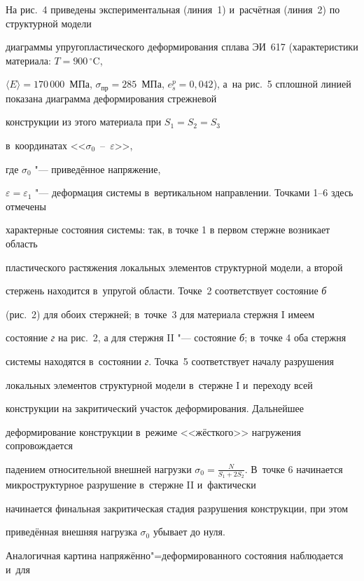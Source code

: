 На рис.~4 приведены экспериментальная (линия~1) и~расчётная (линия~2) по структурной модели

диаграммы упругопластического деформирования сплава ЭИ~617 (характеристики материала: $T =900\,^\circ$C, 

$\langle E\rangle=170\,000$~МПа, $\sigma_{\text{пр}}=285$~МПа, $e_s^p=0,042$), а~на рис.~5 сплошной линией показана диаграмма деформирования стрежневой

конструкции из этого материала при $S_1=S_2=S_3$

в~координатах <<$\sigma_0$~--~$\varepsilon$>>, 

где $\sigma_0$ "--- приведённое напряжение,

$ \varepsilon=\varepsilon_1$ "--- деформация системы в~вертикальном направлении. Точками 1--6 здесь отмечены

характерные состояния системы: так, в точке 1  в первом стержне возникает область

пластического растяжения локальных элементов структурной модели, а второй

стержень находится в~упругой области. Точке~2 соответствует состояние \textsl{б}

(рис.~2) для обоих стержней; в~точке~3 для материала стержня I имеем

состояние \textsl{г} на рис.~2, а для стержня II "--- состояние \textsl{б}; в~точке 4 оба стержня 

системы находятся в~состоянии \textsl{г}. Точка~5 соответствует началу разрушения

локальных элементов структурной модели в~стержне I и~переходу всей

конструкции на закритический участок деформирования. Дальнейшее

деформирование конструкции в~режиме <<жёсткого>> нагружения сопровождается

падением относительной внешней нагрузки $\sigma_0=\frac{N}{S_1+2S_2}$. В~точке 6 начинается микроструктурное разрушение в~стержне II и~фактически

начинается финальная закритическая стадия разрушения конструкции, при этом

приведённая внешняя нагрузка $\sigma _0 $ убывает до нуля.









Аналогичная картина напряжённо"=деформированного состояния наблюдается и~для

